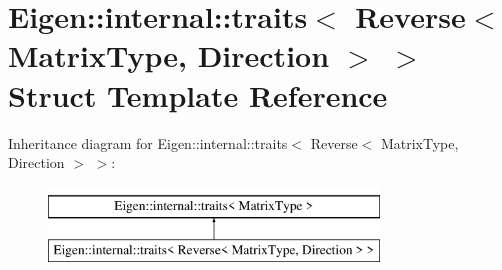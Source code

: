 \hypertarget{struct_eigen_1_1internal_1_1traits_3_01_reverse_3_01_matrix_type_00_01_direction_01_4_01_4}{}\section{Eigen\+::internal\+::traits$<$ Reverse$<$ Matrix\+Type, Direction $>$ $>$ Struct Template Reference}
\label{struct_eigen_1_1internal_1_1traits_3_01_reverse_3_01_matrix_type_00_01_direction_01_4_01_4}
Inheritance diagram for Eigen\+::internal\+::traits$<$ Reverse$<$ Matrix\+Type, Direction $>$ $>$\+:\begin{figure}[H]
\begin{center}
\leavevmode
\includegraphics[height=2.000000cm]{struct_eigen_1_1internal_1_1traits_3_01_reverse_3_01_matrix_type_00_01_direction_01_4_01_4}
\end{center}
\end{figure}
